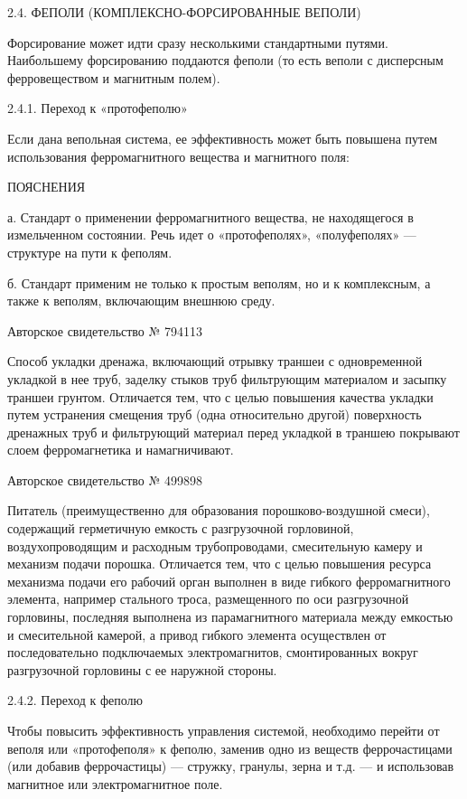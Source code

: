 2.4. ФЕПОЛИ (КОМПЛЕКСНО-ФОРСИРОВАННЫЕ ВЕПОЛИ)

Форсирование  может   идти  сразу  несколькими   стандартными  путями.
Наибольшему форсированию поддаются феполи (то есть веполи с дисперсным
ферровеществом и магнитным полем).


2.4.1. Переход к «протофеполю»

Если  дана вепольная  система,  ее эффективность  может быть  повышена
путем использования ферромагнитного вещества и магнитного поля:


ПОЯСНЕНИЯ

а. Стандарт  о применении ферромагнитного вещества,  не находящегося в
измельченном состоянии.  Речь идет  о «протофеполях»,  «полуфеполях» —
структуре на пути к феполям.

б. Стандарт применим не только к  простым веполям, но и к комплексным,
а также к веполям, включающим внешнюю среду.


Авторское свидетельство № 794113

Способ  укладки дренажа,  включающий отрывку  траншеи с  одновременной
укладкой  в нее  труб, заделку  стыков труб  фильтрующим материалом  и
засыпку  траншеи  грунтом.  Отличается  тем,  что  с  целью  повышения
качества  укладки путем  устранения смещения  труб (одна  относительно
другой)  поверхность  дренажных  труб  и  фильтрующий  материал  перед
укладкой в траншею покрывают слоем ферромагнетика и намагничивают.


Авторское свидетельство № 499898

Питатель   (преимущественно    для   образования   порошково-воздушной
смеси),  содержащий  герметичную  емкость с  разгрузочной  горловиной,
воздухопроводящим  и расходным  трубопроводами, смесительную  камеру и
механизм  подачи  порошка.  Отличается  тем,  что  с  целью  повышения
ресурса механизма  подачи его  рабочий орган  выполнен в  виде гибкого
ферромагнитного  элемента, например  стального троса,  размещенного по
оси  разгрузочной  горловины,  последняя выполнена  из  парамагнитного
материала  между емкостью  и  смесительной камерой,  а привод  гибкого
элемента осуществлен от  последовательно подключаемых электромагнитов,
смонтированных вокруг разгрузочной горловины с ее наружной стороны.


2.4.2. Переход к феполю

Чтобы повысить  эффективность управления системой,  необходимо перейти
от  веполя  или  «протофеполя»  к  феполю,  заменив  одно  из  веществ
феррочастицами (или добавив феррочастицы)  — стружку, гранулы, зерна и
т.д. — и использовав магнитное или электромагнитное поле.

